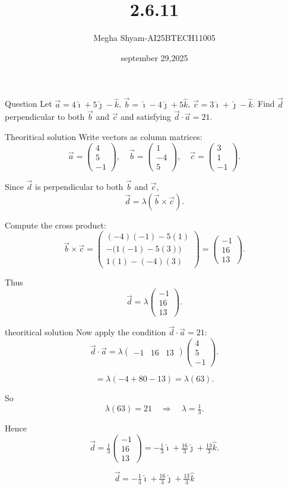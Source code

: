 \documentclass{beamer}
\title %
{2.6.11}
\date{september 29,2025}
\author %
{Megha Shyam-AI25BTECH11005}
\begin{document}
\begin{frame}{Question}
   Let $\vec a = 4\hat\imath+5\hat\jmath-\hat k$, $\vec b=\hat\imath-4\hat\jmath+5\hat k$, $\vec c=3\hat\imath+\hat\jmath-\hat k$.  
Find $\vec d$ perpendicular to both $\vec b$ and $\vec c$ and satisfying $\vec d\cdot\vec a=21$. 
\end{frame}
\begin{frame}{Theoritical solution}
    Write vectors as column matrices:
\[
\vec a=\begin{pmatrix}4\\5\\-1\end{pmatrix},\quad
\vec b=\begin{pmatrix}1\\-4\\5\end{pmatrix},\quad
\vec c=\begin{pmatrix}3\\1\\-1\end{pmatrix}.
\]

Since $\vec d$ is perpendicular to both $\vec b$ and $\vec c$,  
\[
\vec d = \lambda(\vec b\times \vec c).
\]

Compute the cross product:
\[
\vec b\times \vec c =\begin{pmatrix}
(-4)(-1)-5(1)\\[6pt]
-\big(1(-1)-5(3)\big)\\[6pt]
1(1)-(-4)(3)
\end{pmatrix}
=
\begin{pmatrix}-1\\16\\13\end{pmatrix}.
\]

Thus
\[
\vec d = \lambda \begin{pmatrix}-1\\16\\13\end{pmatrix}.
\]
\end{frame}
\begin{frame}{theoritical solution}
    Now apply the condition $\vec d\cdot \vec a = 21$:
\[
\vec d \cdot \vec a 
= \lambda \begin{pmatrix}-1 & 16 & 13\end{pmatrix}
\begin{pmatrix}4\\5\\-1\end{pmatrix}.
\]

\[
= \lambda(-4+80-13)=\lambda(63).
\]

So
\[
\lambda(63)=21 \quad\Rightarrow\quad \lambda=\tfrac{1}{3}.
\]

Hence
\[
\vec d = \tfrac{1}{3}\begin{pmatrix}-1\\16\\13\end{pmatrix}
= -\tfrac{1}{3}\hat\imath + \tfrac{16}{3}\hat\jmath + \tfrac{13}{3}\hat k.
\]

\[
\boxed{\vec d = -\tfrac{1}{3}\hat\imath + \tfrac{16}{3}\hat\jmath + \tfrac{13}{3}\hat k}
\]
\end{frame}
\end{document}
